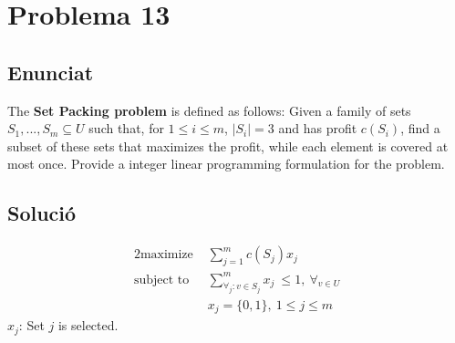 \section{Problema 13}
\subsection{Enunciat}
The \textbf{Set Packing problem} is defined as follows: 
\newline 
Given a family of sets $S_1,...,S_m \subseteq U$ such that, for $1 \leq i \leq m$, $|S_i| = 3$ and has profit $c(S_i)$, find a subset of these sets that maximizes the profit, while each element is covered at most once. Provide a integer linear programming formulation for the problem.
\subsection{Solució}
\begin{alignat*}{2}
    \text{maximize }   & \sum_{j=1}^m c(S_j)x_j  \\
    \text{subject to } & \sum_{\forall_j:v \in S_j}^m x_j \ \leq 1,\ \forall_{v \in U}\\
                       & x_j = \{0,1\},\  1\leq j\leq m
\end{alignat*}
$x_j$: Set $j$ is selected.
